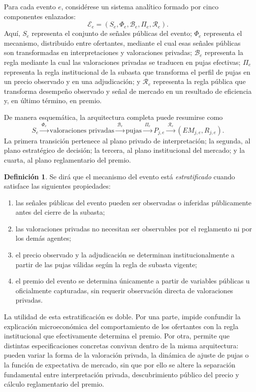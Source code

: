 \documentclass[11pt,a4paper]{article}
\theoremstyle{definition}
\newtheorem{definicion}{Definición}
\begin{document}
Para cada evento $e$, considérese un sistema analítico formado por cinco componentes enlazados:
\[
\mathcal E_e=(S_e,\Phi_e,\mathcal B_e,\Pi_e,\mathcal R_e).
\]
Aquí, $S_e$ representa el conjunto de señales públicas del evento; $\Phi_e$ representa el mecanismo, distribuido entre ofertantes, mediante el cual esas señales públicas son transformadas en interpretaciones y valoraciones privadas; $\mathcal B_e$ representa la regla mediante la cual las valoraciones privadas se traducen en pujas efectivas; $\Pi_e$ representa la regla institucional de la subasta que transforma el perfil de pujas en un precio observado y en una adjudicación; y $\mathcal R_e$ representa la regla pública que transforma desempeño observado y señal de mercado en un resultado de eficiencia y, en último término, en premio.

De manera esquemática, la arquitectura completa puede resumirse como
\[
S_e\xrightarrow{\ \Phi_e\ }\text{valoraciones privadas}\xrightarrow{\ \mathcal B_e\ }\text{pujas}\xrightarrow{\ \Pi_e\ }P_{j,e}\xrightarrow{\ \mathcal R_e\ }(EM_{j,e},R_{j,e}).
\]
La primera transición pertenece al plano privado de interpretación; la segunda, al plano estratégico de decisión; la tercera, al plano institucional del mercado; y la cuarta, al plano reglamentario del premio.

\begin{definicion}
Se dirá que el mecanismo del evento está \emph{estratificado} cuando satisface las siguientes propiedades:
\begin{enumerate}
    \item las señales públicas del evento pueden ser observadas o inferidas públicamente antes del cierre de la subasta;
    \item las valoraciones privadas no necesitan ser observables por el reglamento ni por los demás agentes;
    \item el precio observado y la adjudicación se determinan institucionalmente a partir de las pujas válidas según la regla de subasta vigente;
    \item el premio del evento se determina únicamente a partir de variables públicas u oficialmente capturadas, sin requerir observación directa de valoraciones privadas.
\end{enumerate}
\end{definicion}

La utilidad de esta estratificación es doble. Por una parte, impide confundir la explicación microeconómica del comportamiento de los ofertantes con la regla institucional que efectivamente determina el premio. Por otra, permite que distintas especificaciones concretas convivan dentro de la misma arquitectura: pueden variar la forma de la valoración privada, la dinámica de ajuste de pujas o la función de expectativa de mercado, sin que por ello se altere la separación fundamental entre interpretación privada, descubrimiento público del precio y cálculo reglamentario del premio.
\end{document}
